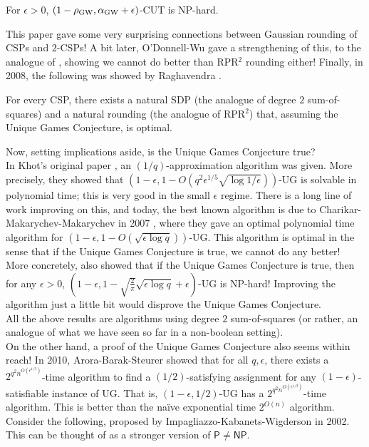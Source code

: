	\begin{theorem}
		For $\epsilon > 0$, $(1-\rho_\text{GW},\alpha_{\text{GW}}+\epsilon)$-CUT is \textsf{NP}-hard.
	\end{theorem}
	This paper gave some very surprising connections between Gaussian rounding of CSPs and $2$-CSPs! A bit later, O'Donnell-Wu gave a strengthening of this, to the analogue of , showing we cannot do better than RPR$^2$ rounding either! Finally, in 2008, the following was showed by Raghavendra \cite{raghavendra-punchline}.

	\begin{ftheo}[Raghavendra]
		For every CSP, there exists a natural SDP (the analogue of degree $2$ sum-of-squares) and a natural rounding (the analogue of RPR$^2$) that, assuming the Unique Games Conjecture, is optimal.
	\end{ftheo}

	Now, setting implications aside, is the Unique Games Conjecture true?\\

	In Khot's original paper \cite{ugc-og}, an $(1/q)$-approximation algorithm was given. More precisely, they showed that $(1-\epsilon,1 - O(q^2\epsilon^{1/5}\sqrt{\log 1/\epsilon}))$-UG is solvable in polynomial time; this is very good in the small $\epsilon$ regime. There is a long line of work improving on this, and today, the best known algorithm is due to Charikar-Makarychev-Makarychev in 2007 \cite{ug-optimal-algo}, where they gave an optimal polynomial time algorithm for $(1-\epsilon,1-O(\sqrt{\epsilon \log q}))$-UG. This algorithm is optimal in the sense that if the Unique Games Conjecture is true, we cannot do any better! More concretely, \cite{max-cut-ugc} also showed that if the Unique Games Conjecture is true, then for any $\epsilon > 0$, $(1-\epsilon,1 - \sqrt{\frac{2}{\pi}}\sqrt{\epsilon \log q} + \epsilon)$-UG is \textsf{NP}-hard! Improving the \cite{ug-optimal-algo} algorithm just a little bit would disprove the Unique Games Conjecture.\\
	All the above results are algorithms using degree $2$ sum-of-squares (or rather, an analogue of what we have seen so far in a non-boolean setting).\\

	On the other hand, a proof of the Unique Games Conjecture also seems within reach!
	In 2010, Arora-Barak-Steurer \cite{subexp-ug} showed that for all $q,\epsilon$, there exists a $2^{q^2n^{O(\epsilon^{1/3})}}$-time algorithm to find a $(1/2)$-satisfying assignment for any $(1-\epsilon)$-satisfiable instance of UG. That is, $(1-\epsilon,1/2)$-UG has a $2^{q^2 n^{O(\epsilon^{1/3})}}$-time algorithm. This is better than the na\"{i}ve exponential time $2^{O(n)}$ algorithm.\\
	Consider the following, proposed by Impagliazzo-Kabanets-Wigderson \cite{eth} in 2002. This can be thought of as a stronger version of $\mathsf{P} \ne \mathsf{NP}$.

